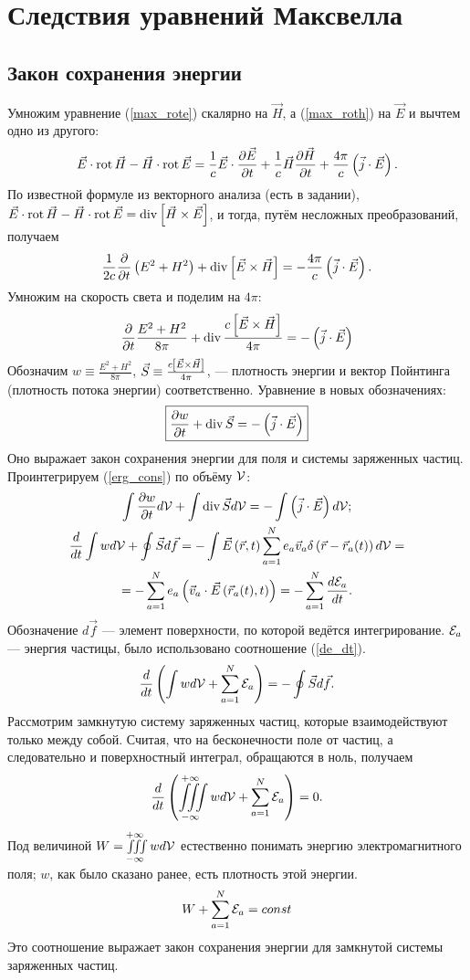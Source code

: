 \newpage
\section{Следствия уравнений Максвелла}
\subsection{Закон сохранения энергии}
    Умножим уравнение (\ref{max_rote}) скалярно на $\vec{H}$, а (\ref{max_roth}) на $\vec{E}$ и вычтем одно из другого:
    \begin{gather*}
        \vec{E}\cdot\operatorname{rot}\vec{H} - \vec{H}\cdot\operatorname{rot}\vec{E} = \frac 1c \vec{E}\cdot\frac{\partial\vec{E}}{\partial t} + \frac 1c \vec{H}\frac{\partial\vec{H}}{\partial t}
        +\frac{4\pi}{c}\left({\vec{j}\cdot\vec{E}}\right).
    \end{gather*}
    По известной формуле из векторного анализа (есть в задании), $\vec{E}\cdot\operatorname{rot}\vec{H} - \vec{H}\cdot\operatorname{rot}\vec{E} = \operatorname{div}\left[{\vec{H}\times\vec{E}}\right]$,
    и тогда, путём несложных преобразований, получаем
    \[
        \frac{1}{2c}\frac{\partial}{\partial t}\left({E^2 + H^2}\right) + \operatorname{div}\left[{\vec{E}\times\vec{H}}\right] = -\frac{4\pi}{c}\left({\vec{j}\cdot\vec{E}}\right).
    \]
    Умножим на скорость света и поделим на $4\pi$:
    \[
        \frac{\partial}{\partial t}\frac{E^2 + H^2}{8\pi} + \operatorname{div}\frac{c\left[{\vec{E}\times\vec{H}}\right]}{4\pi} = -\left({\vec{j}\cdot\vec{E}}\right)
    \]
    Обозначим $w \equiv \frac{E^2 + H^2}{8\pi}$, $\vec{S} \equiv \frac{c\left[{\vec{E}\times\vec{H}}\right]}{4\pi}$, --- плотность энергии
    и вектор Пойнтинга (плотность потока энергии) соответственно. Уравнение в новых обозначениях:
    \begin{equation}
        \boxed{\frac{\partial w}{\partial t} + \operatorname{div}\vec{S} = -\left({\vec{j}\cdot\vec{E}}\right)} \label{erg_cons}
    \end{equation}
    Оно выражает закон сохранения энергии для поля и системы заряженных частиц. Проинтегрируем (\ref{erg_cons}) по объёму $\mathcal{V}$:
    \begin{gather*}
        \int \frac{\partial w}{\partial t} d\mathcal{V} + \int \operatorname{div}\vec{S} d\mathcal{V} = -\int\left({\vec{j}\cdot\vec{E}}\right) d\mathcal{V}; \\
        \frac{d}{dt}\int wd\mathcal{V} + \oint \vec{S}d\vec{f} =
        -\int \vec{E}\left({\vec{r}, t}\right)\sum_{a=1}^N e_a\vec{v}_a\delta\left({\vec{r} - \vec{r}_a(t)}\right)d\mathcal{V} = \\
        = -\sum_{a=1}^N e_a\left({\vec{v}_a \cdot\vec{E}\left({\vec{r}_a(t), t}\right)}\right) = -\sum_{a=1}^N\frac{d\mathcal{E}_a}{dt}.
    \end{gather*}
    Обозначение $d\vec{f}$ --- элемент поверхности, по которой ведётся интегрирование. $\mathcal{E}_a$ --- энергия частицы,
    было использовано соотношение (\ref{de_dt}).
    \[
        \frac{d}{dt}\left({\int wd\mathcal{V} + \sum_{a=1}^N \mathcal{E}_a}\right) = -\oint\vec{S}d\vec{f}.
    \]
    Рассмотрим замкнутую систему заряженных частиц, которые взаимодействуют только между собой. Считая, что на 
    бесконечности поле от частиц, а следовательно и поверхностный интеграл, обращаются в ноль, получаем
    \[
        \frac{d}{dt}\left({\iiint\limits_{-\infty}^{+\infty}wd\mathcal{V} + \sum_{a=1}^N\mathcal{E}_a}\right) = 0.
    \]
    Под величиной $W = \iiint\limits_{-\infty}^{+\infty}wd\mathcal{V}$ естественно понимать энергию электромагнитного поля; $w$, как
    было сказано ранее, есть плотность этой энергии.
    \[
        W + \sum_{a=1}^N\mathcal{E}_a = const
    \]
    Это соотношение выражает закон сохранения энергии для замкнутой системы заряженных частиц.

